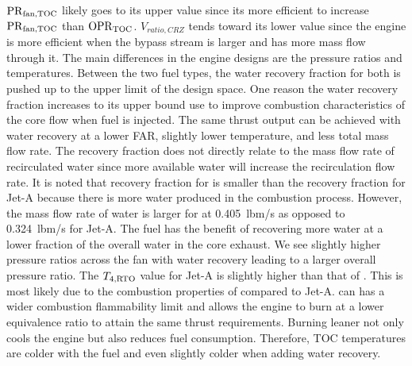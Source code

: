 \documentclass[conf]{new-aiaa}
\begin{document}
\noindent
$\rm{PR}_{fan,TOC}$ likely goes to its upper value since its more efficient to increase $\rm{PR}_{fan,TOC}$ than $\rm{OPR}_{\rm{TOC}}$.
$V_{ratio,CRZ}$ tends toward its lower value since the engine is more efficient when the bypass stream is larger and has more mass flow through it.
The main differences in the engine designs are the pressure ratios and temperatures.
Between the two fuel types, the water recovery fraction for both is pushed up to the upper limit of the design space.
One reason the water recovery fraction increases to its upper bound use to improve combustion characteristics of the core flow when fuel is injected.
The same thrust output can be achieved with water recovery at a lower FAR, slightly lower temperature, and less total mass flow rate.
The recovery fraction does not directly relate to the mass flow rate of recirculated water since more available water will increase the recirculation flow rate.
It is noted that recovery fraction for  is smaller than the recovery fraction for Jet-A because there is more water produced in the combustion process.
However, the mass flow rate of water is larger for  at \SI{0.405}{lbm/s} as opposed to \SI{0.324}{lbm/s} for Jet-A.
The  fuel has the benefit of recovering more water at a lower fraction of the overall water in the core exhaust.
We see slightly higher pressure ratios across the fan with water recovery leading to a larger overall pressure ratio.
The $T_{4,\rm{RTO}}$ value for Jet-A is slightly higher than that of .
This is most likely due to the combustion properties of  compared to Jet-A.
 can has a wider combustion flammability limit and allows the engine to burn at a lower equivalence ratio to attain the same thrust requirements.
Burning leaner not only cools the engine but also reduces fuel consumption.
Therefore, TOC temperatures are colder with the  fuel and even slightly colder when adding water recovery.
\end{document}
